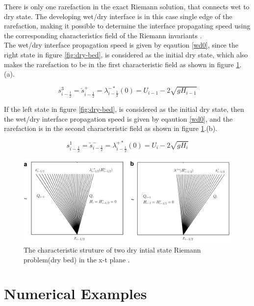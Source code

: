 \documentclass[12pt,a4paper]{article}
\begin{document}
	\noindent There is only one rarefaction in the exact Riemann solution, that connects wet to dry state. The developing wet/dry interface is in this case single edge of the rarefaction, making it possible to determine the interface propagating speed using the corresponding characteristics field of the Riemann invariants \cite{ge:2008}.\\ 
	
	\noindent The wet/dry interface propagation  speed  is given by eqaution \eqref{wd0}, since the right state in figure \ref{fig:dry-bed}, is considered as the initial dry state, which also makes the rarefaction to be in the first characteristic field as shown in figure \ref{fig:wet-dry}.(a).
	
	\begin{equation}
		s_{i-\frac{1}{2}}^{3} = \check{s}_{i-\frac{1}{2}}^{+} = \lambda_{i-\frac{1}{2}}^{-*}(0)= U_{i-1} - 2\sqrt{gH_{i-1}}
		\label{wd0}
	\end{equation}
	
	\noindent If the left state in figure \ref{fig:dry-bed}, is considered as the initial dry state, then the  wet/dry interface propagation  speed  is given by eqaution \eqref{wd0}, and the  rarefaction is in the second characteristic field  as shown in figure \ref{fig:wet-dry}.(b).
	
	\begin{equation}
		s_{i-\frac{1}{2}}^{1} = \check{s}_{i-\frac{1}{2}}^{-} = \lambda_{i-\frac{1}{2}}^{+*}(0)= U_{i} - 2\sqrt{gH_{i}}
		\label{wd1}
	\end{equation}
	
	\begin{figure}[H]
		\centering
		\includegraphics[width=.95\linewidth]{images/wet-dry}
		\caption{ The characteristic struture of  two dry intial state Riemann problem(dry bed) in the x-t plane \cite{ge:2008}.}
		\label{fig:wet-dry}
	\end{figure}
	
	
	
	\section{Numerical Examples}



	
	
	
\end{document}

